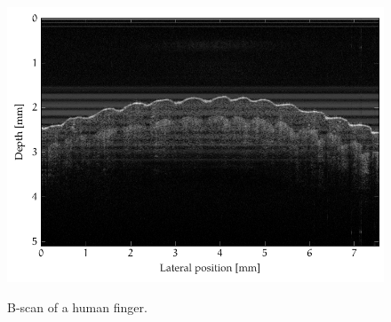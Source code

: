 \begin{figure}[hbt]
\myfloatalign
{\includegraphics[width=\linewidth]{gfx/tikz/axsun/finger}}
\caption{B-scan of a human finger.}\label{fig:finger}
\end{figure}%
